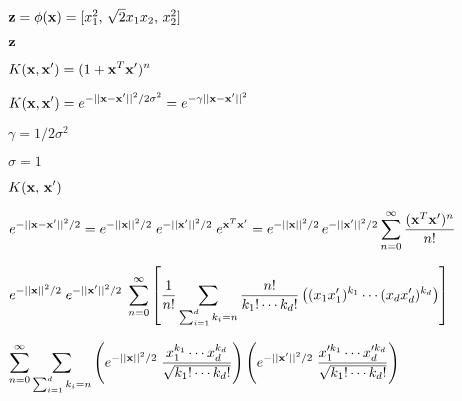 \documentclass{article}
\def\lthtmlcheckvsize{\ifdim\ht\sizebox<\vsize 
  \ifdim\wd\sizebox<\hsize\expandafter\hfill\fi \expandafter\vfill
  \else\expandafter\vss\fi}%
\begin{document}
{\newpage\clearpage
{}%
$ {\bf z}=\phi({\bf x})=[x_1^2,\,\sqrt{2}x_1x_2,\,x_2^2]$%
\lthtmlindisplaymathZ
\lthtmlcheckvsize\clearpage}

{\newpage\clearpage
{}%
$ {\bf z}$%
\lthtmlindisplaymathZ
\lthtmlcheckvsize\clearpage}

{\newpage\clearpage
{}%
$\displaystyle K({\bf x},{\bf x}')=(1+{\bf x}^T{\bf x}')^n$%
\lthtmlindisplaymathZ
\lthtmlcheckvsize\clearpage}

{\newpage\clearpage
{}%
$\displaystyle K({\bf x},{\bf x}')=e^{-||{\bf x}-{\bf x}'||^2/2\sigma^2}
=e^{-\gamma||{\bf x}-{\bf x}'||^2}$%
\lthtmlindisplaymathZ
\lthtmlcheckvsize\clearpage}

{\newpage\clearpage
{}%
$ \gamma=1/2\sigma^2$%
\lthtmlindisplaymathZ
\lthtmlcheckvsize\clearpage}

{\newpage\clearpage
{}%
$ \sigma=1$%
\lthtmlindisplaymathZ
\lthtmlcheckvsize\clearpage}

{\newpage\clearpage
{}%
$\displaystyle K({\bf x},\,{\bf x}')$%
\lthtmlindisplaymathZ
\lthtmlcheckvsize\clearpage}

{\newpage\clearpage
{}%
$\displaystyle e^{-||{\bf x}-{\bf x}'||^2/2}
=e^{-||{\bf x}||^2/2}\; e^{-||{\bf x}'||^2/2}\; e^{{\bf x}^T{\bf x}'}
=e^{-||{\bf x}||^2/2}\, e^{-||{\bf x}'||^2/2}
\sum_{n=0}^\infty \frac{({\bf x}^T{\bf x}')^n}{n!}$%
\lthtmlindisplaymathZ
\lthtmlcheckvsize\clearpage}

{\newpage\clearpage
{}%
$\displaystyle e^{-||{\bf x}||^2/2} \; e^{-||{\bf x}'||^2/2}\;\sum_{n=0}^\infty \left[
\frac{1}{n!}\sum_{\sum_{i=1}^d k_i=n} \frac{n!}{k_1!\cdots k_d! }
\left((x_1x'_1)^{k_1}\cdots (x_dx'_d)^{k_d}\right) \right]$%
\lthtmlindisplaymathZ
\lthtmlcheckvsize\clearpage}

{\newpage\clearpage
{}%
$\displaystyle \sum_{n=0}^\infty \sum_{\sum_{i=1}^d k_i=n}
\left(e^{-||{\bf x} ||^2/2}\; \frac{x _1^{k_1}\cdots x _d^{k_d}}{\sqrt{k_1!\cdots k_d!}}\right)
\left(e^{-||{\bf x}'||^2/2}\; \frac{x_1^{\prime k_1}\cdots x_d^{\prime k_d}}{\sqrt{k_1!\cdots k_d!}}\right)$%
\lthtmlindisplaymathZ
\lthtmlcheckvsize\clearpage}
\end{document}
